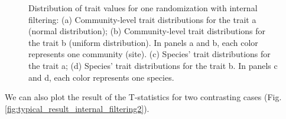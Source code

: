 \documentclass[12pt]{article}\usepackage[]{graphicx}\usepackage[]{color}
\newenvironment{knitrout}{}{} %
\begin{document}
\begin{knitrout}
\begin{figure}
{}

\caption[Distribution of trait values for one randomization with internal filtering]{Distribution of trait values for one randomization with internal filtering: (a) Community-level trait distributions for the trait a (normal distribution); (b) Community-level trait distributions for the trait b (uniform distribution). In panels a and b, each color represents one community (site). (c) Species' trait distributions for the trait a; (d) Species' trait distributions for the trait b. In panels c and d, each color represents one species.}\label{fig:typical_result_internal_filtering1}
\end{figure}


\end{knitrout}

We can also plot the result of the T-statistics for two contrasting cases (Fig. \ref{fig:typical_result_internal_filtering2}).
\end{document}

